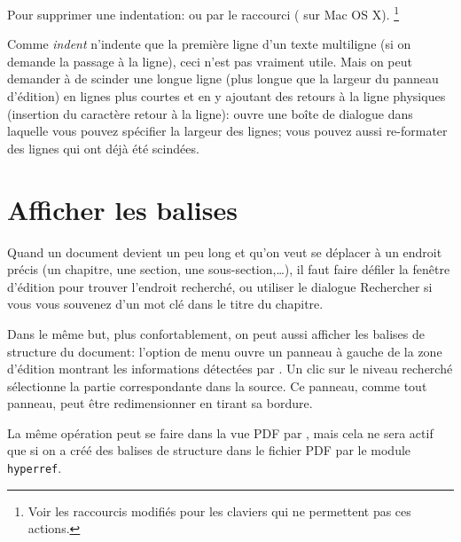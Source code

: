 Pour supprimer une indentation: \submenu{} ou par le raccourci \keysequence{Ctrl+[} (\keysequence{Cmd+[} sur Mac OS X). \footnote{Voir les raccourcis modifiés pour les claviers qui ne permettent pas ces actions.}

Comme \textsl{indent} n'indente que la première ligne d'un texte multiligne (si on demande la passage à la ligne), ceci n'est pas vraiment utile. Mais on peut demander à \Tw{} de scinder une longue ligne (plus longue que la largeur du panneau d'édition) en lignes plus courtes et en y ajoutant des retours à la ligne physiques (insertion du caractère retour à la ligne): \emph{\submenu{}} ouvre une boîte de dialogue dans laquelle vous pouvez spécifier la largeur des lignes; vous pouvez aussi re-formater des lignes qui ont déjà été scindées.
%

\section{Afficher les balises}

Quand un document devient un peu long et qu'on veut se déplacer à un endroit précis (un chapitre, une section, une sous-section,\dots), il faut faire défiler la fenêtre d'édition pour trouver l'endroit recherché, ou utiliser le dialogue Rechercher si vous vous souvenez d'un mot clé dans le titre du chapitre.

Dans le même but, plus confortablement, on peut aussi afficher les balises de structure du document: l'option de menu \submenu{}\submenu{} ouvre  un panneau à gauche de la zone d'édition montrant les informations détectées par \Tw. Un clic sur le niveau recherché sélectionne la partie correspondante dans la source. Ce panneau, comme tout panneau, peut être redimensionner en tirant sa bordure.


La même opération peut se faire dans la vue PDF par \submenu{}\submenu{}, mais cela ne sera actif que si on a créé des balises de structure dans le fichier PDF par le module \verb|hyperref|.

